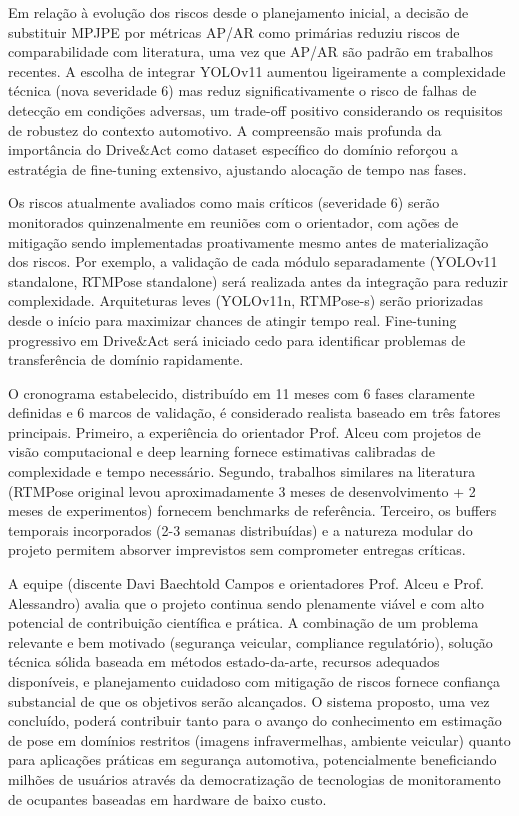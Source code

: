 \documentclass[12pt, a4paper]{article}
\begin{document}
Em relação à evolução dos riscos desde o planejamento inicial, a decisão de substituir MPJPE por métricas AP/AR como primárias reduziu riscos de comparabilidade com literatura, uma vez que AP/AR são padrão em trabalhos recentes. A escolha de integrar YOLOv11 aumentou ligeiramente a complexidade técnica (nova severidade 6) mas reduz significativamente o risco de falhas de detecção em condições adversas, um trade-off positivo considerando os requisitos de robustez do contexto automotivo. A compreensão mais profunda da importância do Drive\&Act como dataset específico do domínio reforçou a estratégia de fine-tuning extensivo, ajustando alocação de tempo nas fases.

Os riscos atualmente avaliados como mais críticos (severidade 6) serão monitorados quinzenalmente em reuniões com o orientador, com ações de mitigação sendo implementadas proativamente mesmo antes de materialização dos riscos. Por exemplo, a validação de cada módulo separadamente (YOLOv11 standalone, RTMPose standalone) será realizada antes da integração para reduzir complexidade. Arquiteturas leves (YOLOv11n, RTMPose-s) serão priorizadas desde o início para maximizar chances de atingir tempo real. Fine-tuning progressivo em Drive\&Act será iniciado cedo para identificar problemas de transferência de domínio rapidamente.

O cronograma estabelecido, distribuído em 11 meses com 6 fases claramente definidas e 6 marcos de validação, é considerado realista baseado em três fatores principais. Primeiro, a experiência do orientador Prof. Alceu com projetos de visão computacional e deep learning fornece estimativas calibradas de complexidade e tempo necessário. Segundo, trabalhos similares na literatura (RTMPose original levou aproximadamente 3 meses de desenvolvimento + 2 meses de experimentos) fornecem benchmarks de referência. Terceiro, os buffers temporais incorporados (2-3 semanas distribuídas) e a natureza modular do projeto permitem absorver imprevistos sem comprometer entregas críticas.

A equipe (discente Davi Baechtold Campos e orientadores Prof. Alceu e Prof. Alessandro) avalia que o projeto continua sendo plenamente viável e com alto potencial de contribuição científica e prática. A combinação de um problema relevante e bem motivado (segurança veicular, compliance regulatório), solução técnica sólida baseada em métodos estado-da-arte, recursos adequados disponíveis, e planejamento cuidadoso com mitigação de riscos fornece confiança substancial de que os objetivos serão alcançados. O sistema proposto, uma vez concluído, poderá contribuir tanto para o avanço do conhecimento em estimação de pose em domínios restritos (imagens infravermelhas, ambiente veicular) quanto para aplicações práticas em segurança automotiva, potencialmente beneficiando milhões de usuários através da democratização de tecnologias de monitoramento de ocupantes baseadas em hardware de baixo custo.
\end{document}
